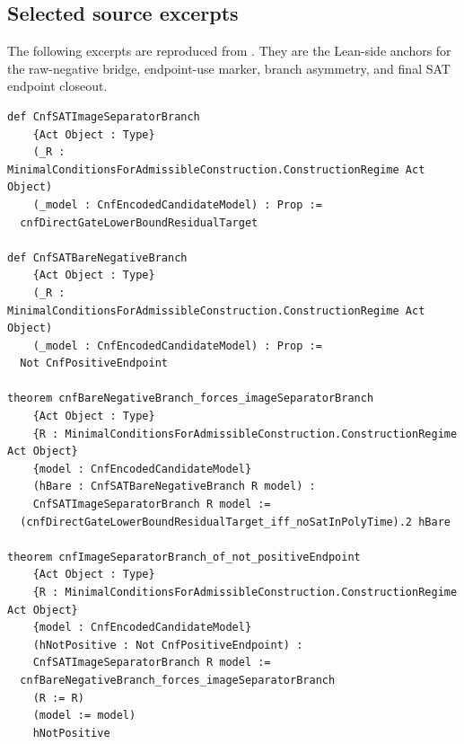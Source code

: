 \documentclass[11pt]{article}
\theoremstyle{definition}
\theoremstyle{remark}
\newcommand{\LeanName}[1]{{\ttfamily\footnotesize\detokenize{#1}}}
\begin{document}
\subsection{Selected source excerpts}

The following excerpts are reproduced from \LeanName{SATOperatorProofQueue.lean}. They are the Lean-side anchors for the raw-negative bridge, endpoint-use marker, branch asymmetry, and final SAT endpoint closeout.

\begin{lstlisting}[basicstyle=\ttfamily\scriptsize]
def CnfSATImageSeparatorBranch
    {Act Object : Type}
    (_R : MinimalConditionsForAdmissibleConstruction.ConstructionRegime Act Object)
    (_model : CnfEncodedCandidateModel) : Prop :=
  cnfDirectGateLowerBoundResidualTarget

def CnfSATBareNegativeBranch
    {Act Object : Type}
    (_R : MinimalConditionsForAdmissibleConstruction.ConstructionRegime Act Object)
    (_model : CnfEncodedCandidateModel) : Prop :=
  Not CnfPositiveEndpoint

theorem cnfBareNegativeBranch_forces_imageSeparatorBranch
    {Act Object : Type}
    {R : MinimalConditionsForAdmissibleConstruction.ConstructionRegime Act Object}
    {model : CnfEncodedCandidateModel}
    (hBare : CnfSATBareNegativeBranch R model) :
    CnfSATImageSeparatorBranch R model :=
  (cnfDirectGateLowerBoundResidualTarget_iff_noSatInPolyTime).2 hBare

theorem cnfImageSeparatorBranch_of_not_positiveEndpoint
    {Act Object : Type}
    {R : MinimalConditionsForAdmissibleConstruction.ConstructionRegime Act Object}
    {model : CnfEncodedCandidateModel}
    (hNotPositive : Not CnfPositiveEndpoint) :
    CnfSATImageSeparatorBranch R model :=
  cnfBareNegativeBranch_forces_imageSeparatorBranch
    (R := R)
    (model := model)
    hNotPositive
\end{lstlisting}
\end{document}
